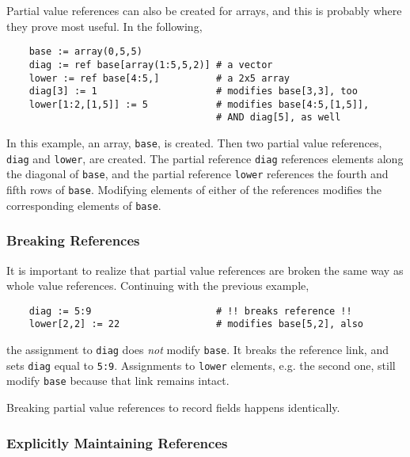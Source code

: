 Partial value references can also be created for arrays, and this is probably where
they prove most useful. In the following,
\begin{verbatim}
    base := array(0,5,5)
    diag := ref base[array(1:5,5,2)] # a vector
    lower := ref base[4:5,]          # a 2x5 array
    diag[3] := 1                     # modifies base[3,3], too
    lower[1:2,[1,5]] := 5            # modifies base[4:5,[1,5]],
                                     # AND diag[5], as well
\end{verbatim}
In this example, an array, {\tt base}, is created. Then two partial value 
references, {\tt diag} and {\tt lower}, are created. The partial
reference {\tt diag} references 
elements along the diagonal of {\tt base}, and the partial
reference {\tt lower} references
the fourth and fifth rows of {\tt base}. Modifying elements of either of
the references modifies the corresponding elements of
{\tt base}.

\subsubsection{Breaking References}

It is important to realize that partial value references are broken the
same way as whole value references. Continuing with the previous 
example,
\begin{verbatim}
    diag := 5:9                      # !! breaks reference !!
    lower[2,2] := 22                 # modifies base[5,2], also
\end{verbatim}
the assignment to {\tt diag} does {\em not} modify {\tt base}. It breaks the
reference link, and sets {\tt diag} equal to {\tt 5:9}. Assignments to {\tt lower}
elements, e.g. the second one, still modify {\tt base} because that link
remains intact.

Breaking partial value references to record fields happens identically.

\subsubsection{Explicitly Maintaining References}

